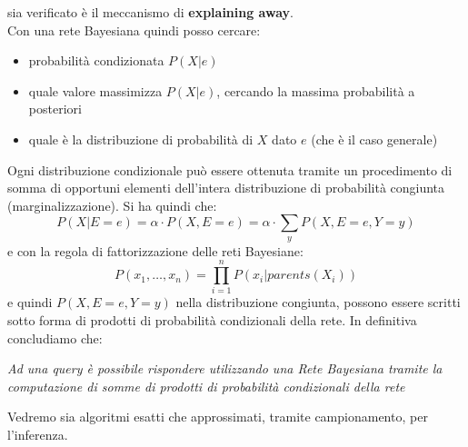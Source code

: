 \documentclass[a4paper,12pt, oneside]{book}
\begin{document}
sia verificato è il meccanismo di
\textbf{explaining away}.\\
Con una rete Bayesiana quindi posso cercare:
\begin{itemize}
  \item probabilità condizionata $P(X|e)$
  \item quale valore massimizza $P(X|e)$, cercando la massima probabilità a
  posteriori
  \item quale è la distribuzione di probabilità di $X$ dato $e$ (che è il caso
  generale) 
\end{itemize}
Ogni distribuzione condizionale può essere ottenuta
tramite un procedimento di somma di opportuni elementi dell’intera distribuzione
di probabilità congiunta 
(marginalizzazione). Si ha quindi che:
\[P(X|E=e)=\alpha\cdot P(X,E=e)=\alpha\cdot \sum_y P(X,E=e, Y=y)\]
e con la regola di fattorizzazione delle reti Bayesiane:
\[P(x_1,\ldots,x_n)=\prod_{i=1}^nP(x_i|parents(X_i))\]
e quindi $P(X,E=e, Y=y)$ nella distribuzione congiunta, possono essere scritti
sotto 
forma di prodotti di probabilità condizionali della rete.
In definitiva concludiamo che:
\begin{center}
  \textit{Ad una query è possibile rispondere utilizzando una Rete Bayesiana
    tramite la computazione di 
    somme di prodotti di probabilità condizionali della rete}
\end{center}
Vedremo sia algoritmi esatti che approssimati, tramite campionamento, per
l'inferenza.\\
\end{document}
